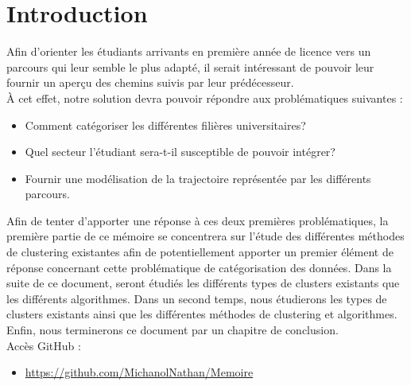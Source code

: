 \documentclass[memoire.tex]{subfiles}
\begin{document}
\chapter*{Introduction}
Afin d'orienter les étudiants arrivants en première année de licence vers un parcours qui leur semble le plus adapté, il serait intéressant de pouvoir leur fournir un aperçu des chemins suivis par leur prédécesseur.\\
À cet effet, notre solution devra pouvoir répondre aux problématiques suivantes : 
\begin{itemize}
\item Comment catégoriser les différentes filières universitaires?
\item Quel secteur l'étudiant sera-t-il susceptible de pouvoir intégrer?
\item Fournir une modélisation de la trajectoire représentée par les différents parcours.
\end{itemize}
Afin de tenter d'apporter une réponse à ces deux premières problématiques, la première partie de ce mémoire se concentrera sur l'étude des différentes méthodes de clustering existantes afin de potentiellement apporter un premier élément de réponse concernant cette problématique de catégorisation des données. Dans la suite de ce document, seront étudiés les différents types de clusters existants que les différents algorithmes. Dans un second temps, nous étudierons les types de clusters existants ainsi que les différentes méthodes de clustering et algorithmes. Enfin, nous terminerons ce document par un chapitre de conclusion.\\

Accès GitHub : \begin{itemize}
\item \url{https://github.com/MichanolNathan/Memoire}
\end{itemize}
\end{document}
